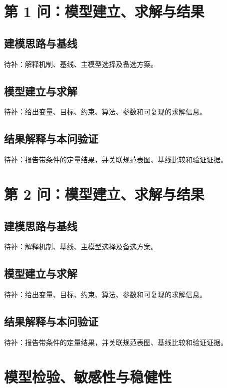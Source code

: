 \documentclass[UTF8,zihao=-4]{ctexart}
\begin{document}
\section{第 1 问：模型建立、求解与结果}

\subsection{建模思路与基线}

待补：解释机制、基线、主模型选择及备选方案。

\subsection{模型建立与求解}

待补：给出变量、目标、约束、算法、参数和可复现的求解信息。

\subsection{结果解释与本问验证}

待补：报告带条件的定量结果，并关联规范表图、基线比较和验证证据。

\section{第 2 问：模型建立、求解与结果}

\subsection{建模思路与基线}

待补：解释机制、基线、主模型选择及备选方案。

\subsection{模型建立与求解}

待补：给出变量、目标、约束、算法、参数和可复现的求解信息。

\subsection{结果解释与本问验证}

待补：报告带条件的定量结果，并关联规范表图、基线比较和验证证据。

\section{模型检验、敏感性与稳健性}
\end{document}
